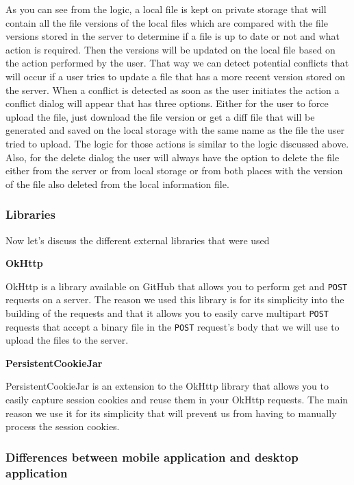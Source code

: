 \documentclass[11pt]{article}
\begin{document}
As you can see from the logic, a local file is kept on private storage that will contain all the file versions of the local files which are compared with the file versions stored in the server to determine if a file is up to date or not and what action is required. Then the versions will be updated on the local file based on the action performed by the user. That way we can detect potential conflicts that will occur if a user tries to update a file that has a more recent version stored on the server. When a conflict is detected as soon as the user initiates the action a conflict dialog will appear that has three options. Either for the user to force upload the file, just download the file version or get a diff file that will be generated and saved on the local storage with the same name as the file the user tried to upload. The logic for those actions is similar to the logic discussed above. Also, for the delete dialog the user will always have the option to delete the file either from the server or from local storage or from both places with the version of the file also deleted from the local information file.

\subsubsection*{Libraries}

Now let’s discuss the different external libraries that were used

\textbf{OkHttp}

OkHttp \cite{okhttp:19} is a library available on GitHub that allows you to perform get and {\tt POST} requests on a server. The reason we used this library is for its simplicity into the building of the requests and that it allows you to easily carve multipart {\tt POST} requests that accept a binary file in the {\tt POST} request’s body that we will use to upload the files to the server.

\textbf{PersistentCookieJar}

PersistentCookieJar \cite{persistentcookiejar:19} is an extension to the OkHttp library that allows you to easily capture session cookies and reuse them in your OkHttp requests. The main reason we use it for its simplicity that will prevent us from having to manually process the session cookies.

\subsubsection*{Differences between mobile application and desktop application}
\end{document}
